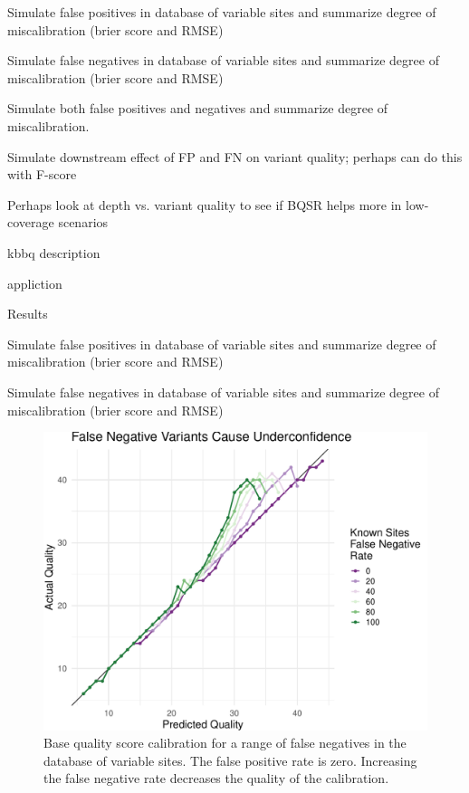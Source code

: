 \documentclass{article}
\begin{document}
\begin{outline}
\begin{outline}
		\item Simulate false positives in database of variable sites and summarize degree of miscalibration (brier score and RMSE)
		\item Simulate false negatives in database of variable sites and summarize degree of miscalibration (brier score and RMSE)
		\item Simulate both false positives and negatives and summarize degree of miscalibration.
		\item Simulate downstream effect of FP and FN on variant quality; perhaps can do this with F-score
		\item Perhaps look at depth vs. variant quality to see if BQSR helps more in low-coverage scenarios
		\item kbbq description
		\item appliction
	\end{outline}
	\item Results
	\begin{outline}
		\item Simulate false positives in database of variable sites and summarize degree of miscalibration (brier score and RMSE)
		\item Simulate false negatives in database of variable sites and summarize degree of miscalibration (brier score and RMSE)
		\begin{figure}[h]
			\includegraphics[width=5in]{./figures/fnr.pdf}
			\caption{Base quality score calibration for a range of false negatives in the database of variable sites. The false positive rate is zero. Increasing the false negative rate decreases the quality of the calibration.}

\end{figure}
\end{outline}
\end{outline}
\end{document}
